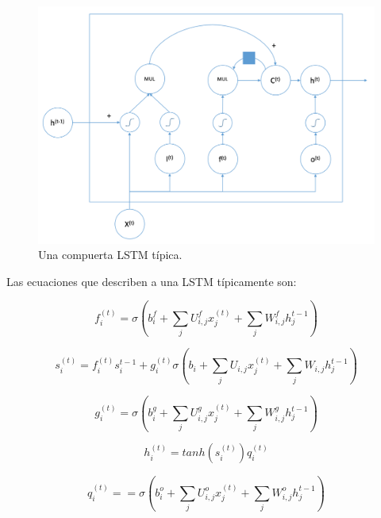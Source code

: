    	\begin{figure}
   		\centering
   		\includegraphics[width=\textwidth]{capitulo2/images/lstm}
   		\caption{Una compuerta LSTM típica.}
   		\label{fig:lstm}
	   \end{figure}
	   
	Las ecuaciones que describen a una LSTM típicamente son:  

	\begin{equation}
		f_{i}^{(t)} = \sigma \left( b_{i}^{f} + \sum_{j} U_{i,j}^{f} x_{j}^{(t)} + \sum_{j} W_{i,j}^{f} h_{j}^{t-1} \right)
	\end{equation}

	\begin{equation}
		s_{i}^{(t)} = f_{i}^{(t)} s_{i}^{t-1} + g_{i}^{(t)} \sigma \left( b_{i} + \sum_{j} U_{i,j} x_{j}^{(t)} + \sum_{j} W_{i,j} h_{j}^{t-1} \right)
	\end{equation}

	\begin{equation}
		g_{i}^{(t)} = \sigma \left( b_{i}^{g} + \sum_{j} U_{i,j}^{g} x_{j}^{(t)} + \sum_{j} W_{i,j}^{g} h_{j}^{t-1} \right)
	\end{equation}

	\begin{equation}
		h_{i}^{(t)} = tanh \left( s_{i}^{(t)} \right) q_{i}^{(t)}
	\end{equation}

	\begin{equation}
		q_{i}^{(t)} = = \sigma \left( b_{i}^{o} + \sum_{j} U_{i,j}^{o} x_{j}^{(t)} + \sum_{j} W_{i,j}^{o} h_{j}^{t-1} \right)
	\end{equation}

